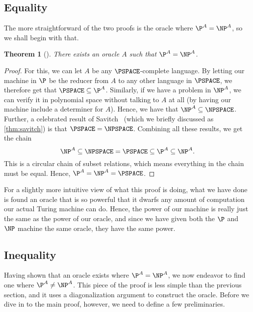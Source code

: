 \documentclass[english,12pt]{reedthesis}
\theoremstyle{plain}
\newtheorem{thm}{Theorem}[section]
\theoremstyle{definition}
\theoremstyle{remark}
\begin{document}
\subsection{Equality}

The more straightforward of the two proofs is the oracle where
$\P^{A} = \NP^{A}$, so we shall begin with that.

\begin{thm}[{\cite[Theorem 2]{BGS75}}]\label{thm:p-np-rel}
  There exists an oracle $A$ such that $\P^{A} = \NP^{A}$.
\end{thm}

\begin{proof}
  For this, we can let $A$ be any $\PSPACE$-complete language. By letting our
  machine in $\P$ be the reducer from $A$ to any other language in $\PSPACE$, we
  therefore get that $\PSPACE \subseteq \P^{A}$. Similarly, if we have a problem in
  $\NP^{A}$, we can verify it in polynomial space without talking to $A$ at all
  (by having our machine include a determiner for $A$). Hence, we have that
  $\NP^{A} \subseteq \NPSPACE$. Further, a celebrated result of Savitch~\cite{Sav70}
  (which we briefly discussed as \cref{thm:savitch}) is that
  $\PSPACE = \NPSPACE$. Combining all these results, we get the chain
  \begin{equation}
    \NP^{A} \subseteq \NPSPACE = \PSPACE \subseteq \P^{A} \subseteq \NP^{A}.
  \end{equation}
  This is a circular chain of subset relations, which means everything in the
  chain must be equal. Hence, $\P^{A} = \NP^{A} = \PSPACE$.
\end{proof}

For a slightly more intuitive view of what this proof is doing, what we have
done is found an oracle that is so powerful that it dwarfs any amount of
computation our actual Turing machine can do. Hence, the power of our machine is
really just the same as the power of our oracle, and since we have given both
the $\P$ and $\NP$ machine the same oracle, they have the same power.

\subsection{Inequality}

Having shown that an oracle exists where $\P^{A} = \NP^{A}$, we now endeavor to
find one where $\P^{A} \ne \NP^{A}$. This piece of the proof is less simple than
the previous section, and it uses a diagonalization argument to construct the
oracle. Before we dive in to the main proof, however, we need to define a few
preliminaries.
\end{document}
